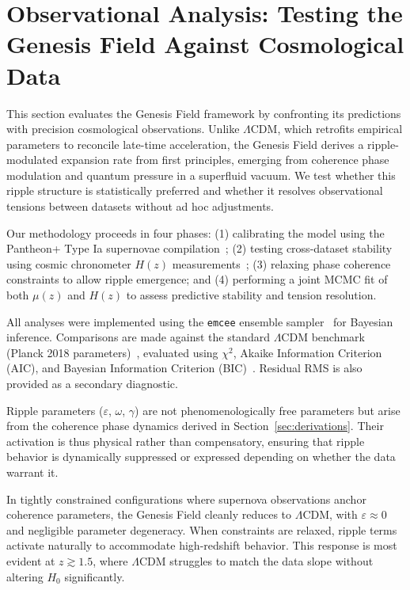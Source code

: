 \section{Observational Analysis: Testing the Genesis Field Against Cosmological Data}
\label{sec:observations}

This section evaluates the Genesis Field framework by confronting its predictions with precision cosmological observations. Unlike $\Lambda$CDM, which retrofits empirical parameters to reconcile late-time acceleration, the Genesis Field derives a ripple-modulated expansion rate from first principles, emerging from coherence phase modulation and quantum pressure in a superfluid vacuum. We test whether this ripple structure is statistically preferred and whether it resolves observational tensions between datasets without ad hoc adjustments.

Our methodology proceeds in four phases: (1) calibrating the model using the Pantheon+ Type Ia supernovae compilation~\cite{Brout2022, Scolnic2018}; (2) testing cross-dataset stability using cosmic chronometer $H(z)$ measurements~\cite{Moresco2016, Stern2010, Farooq2017}; (3) relaxing phase coherence constraints to allow ripple emergence; and (4) performing a joint MCMC fit of both $\mu(z)$ and $H(z)$ to assess predictive stability and tension resolution.

All analyses were implemented using the \texttt{emcee} ensemble sampler~\cite{ForemanMackey2013} for Bayesian inference. Comparisons are made against the standard $\Lambda$CDM benchmark (Planck 2018 parameters)~\cite{Planck2018}, evaluated using $\chi^2$, Akaike Information Criterion (AIC), and Bayesian Information Criterion (BIC)~\cite{Liddle2007, Burnham2002}. Residual RMS is also provided as a secondary diagnostic.

Ripple parameters ($\varepsilon$, $\omega$, $\gamma$) are not phenomenologically free parameters but arise from the coherence phase dynamics derived in Section~\ref{sec:derivations}. Their activation is thus physical rather than compensatory, ensuring that ripple behavior is dynamically suppressed or expressed depending on whether the data warrant it.

In tightly constrained configurations where supernova observations anchor coherence parameters, the Genesis Field cleanly reduces to $\Lambda$CDM, with $\varepsilon \approx 0$ and negligible parameter degeneracy. When constraints are relaxed, ripple terms activate naturally to accommodate high-redshift behavior. This response is most evident at $z \gtrsim 1.5$, where $\Lambda$CDM struggles to match the data slope without altering $H_0$ significantly.

